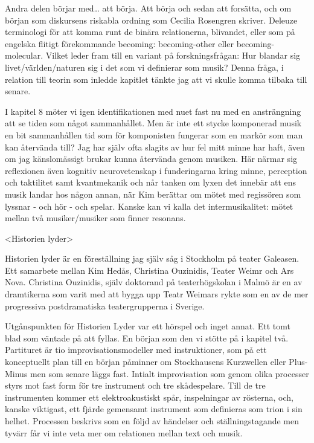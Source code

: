 \documentclass{article}
\begin{document}
Andra delen börjar med\dots{} att börja. Att börja och sedan att forsätta, och om början som diskursens riskabla ordning som Cecilia Rosengren skriver. Deleuze terminologi för att komma runt de binära relationerna, blivandet, eller som på engelska flitigt förekommande becoming: becoming-other eller becoming-molecular. Vilket leder fram till en variant på forskningsfrågan: Hur blandar sig livet/världen/naturen sig i det som vi definierar som musik? Denna fråga, i relation till teorin som inledde kapitlet tänkte jag att vi skulle komma tilbaka till senare.

I kapitel 8 möter vi igen identifikationen med nuet fast nu med en ansträngning att se tiden som något sammanhållet. Men är inte ett stycke komponerad musik en bit sammanhållen tid som för komponisten fungerar som en markör som man kan återvända till? Jag har själv ofta slagits av hur fel mitt minne har haft, även om jag känslomässigt brukar kunna återvända genom musiken. Här närmar sig reflexionen även kognitiv neurovetenskap i funderingarna kring minne, perception och taktilitet samt kvantmekanik och når tanken om lyxen det innebär att ens musik landar hos någon annan, när Kim berättar om mötet med regissören som lyssnar - och hör - och spelar. Kanske kan vi kalla det intermusikalitet: mötet mellan två musiker/musiker som finner resonans.

\textless{}Historien lyder\textgreater{}

Historien lyder är en föreställning jag själv såg i Stockholm på teater Galeasen. Ett samarbete mellan Kim Hedås, Christina Ouzinidis, Teater Weimr och Ars Nova. Christina Ouzinidis, själv doktorand på teaterhögskolan i Malmö är en av dramtikerna som varit med att bygga upp Teatr Weimars rykte som en av de mer progressiva postdramatiska teatergrupperna i Sverige.

Utgånspunkten för Historien Lyder var ett hörspel och inget annat. Ett tomt blad som väntade på att fyllas. En början som den vi stötte på i kapitel två. Partituret är tio improvisationsmodeller med instruktioner, som på ett konceptuellt plan till en början påminner om Stockhausens Kurzwellen eller Plus-Minus men som senare läggs fast. Intialt improvisation som genom olika processer styrs mot fast form för tre instrument och tre skådespelare. Till de tre instrumenten kommer ett elektroakustiskt spår, inspelningar av rösterna, och, kanske viktigast, ett fjärde gemensamt instrument som definieras som trion i sin helhet. Processen beskrivs som en följd av händelser och ställningstagande men tyvärr får vi inte veta mer om relationen mellan text och musik.
\end{document}
